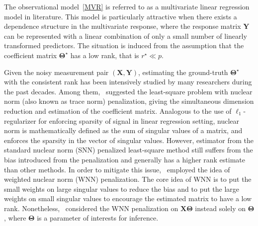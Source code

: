 \documentclass[alpha-refs]{wiley-article}
\begin{document}
The observational model~\eqref{MVR} is referred to as a multivariate linear regression model in literature.
This model is particularly attractive when there exists a dependence structure in the multivariate response, where the response matrix $\boldsymbol{Y}$ can be represented with a linear combination of only a small number of linearly transformed predictors.
The situation is induced from the assumption that the coefficient matrix $\boldsymbol{\Theta}^{\star}$ has a low rank, that is $r^{\star} \ll p$.

Given the noisy measurement pair $(\boldsymbol{X},\boldsymbol{Y})$, estimating the ground-truth $\boldsymbol{\Theta}^{\star}$ with the consistent rank has been intensively studied by many researchers during the past decades.
Among them,~\citet{yuan2007dimension} suggested the least-square problem with nuclear norm (also known as trace norm) penalization, giving the simultaneous dimension reduction and estimation of the coefficient matrix.
Analogous to the use of $\ell_{1}$-regularizer for enforcing sparsity of signal in linear regression setting,
nuclear norm is mathematically defined as the sum of singular values of a matrix, and enforces the sparsity in the vector of singular values.
However, estimator from the standard nuclear norm (SNN) penalized least-square method still suffers from the bias introduced from the penalization and generally has a higher rank estimate than other methods.
In order to mitigate this issue,~\citet{chen2013reduced} employed the idea of weighted nuclear norm (WNN) penalization.
The core idea of WNN is to put the small weights on large singular values to reduce the bias and to put the large weights on small singular values to encourage the estimated matrix to have a low rank.
Nonetheless,~\citet{chen2013reduced} considered the WNN penalization on $\boldsymbol{X\Theta}$ instead solely on $\boldsymbol{\Theta}$, where $\boldsymbol{\Theta}$ is a parameter of interests for inference.
\end{document}
